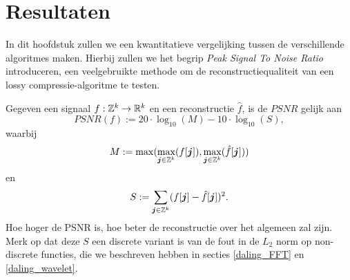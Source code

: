 \chapter{Resultaten}
\label{sectie_psnr}
In dit hoofdstuk zullen we een kwantitatieve vergelijking tussen de verschillende algoritmes maken. Hierbij zullen we het begrip \emph{Peak Signal To Noise Ratio} introduceren, een veelgebruikte methode om de reconstructiequaliteit van een lossy compressie-algoritme te testen.

\begin{definitie}
  Gegeven een signaal $f: \mathbb{Z}^k \to \mathbb{R}^k$ en een reconstructie $\hat f$, is de $PSNR$ gelijk aan
  \[
  PSNR(f) := 20 \cdot \log_{10}( M ) - 10 \cdot \log_{10}(S),
  \]
  waarbij
  \[
  M := \max( \max_{\boldsymbol j \in \mathbb{Z}^k} (f[\boldsymbol j]), \max_{\boldsymbol j \in \mathbb{Z}^k} (\hat f[\boldsymbol j]))
  \]
  en
  \[
  S := \sum_{\boldsymbol j \in \mathbb{Z}^k} (f[\boldsymbol j] - \hat f[\boldsymbol j])^2.
  \]
  Hoe hoger de PSNR is, hoe beter de reconstructie over het algemeen zal zijn.
  Merk op dat deze $S$ een discrete variant is van de fout in de $L_2$ norm op non-discrete functies,
  die we beschreven hebben in secties \ref{daling_FFT} en \ref{daling_wavelet}.
\end{definitie}

